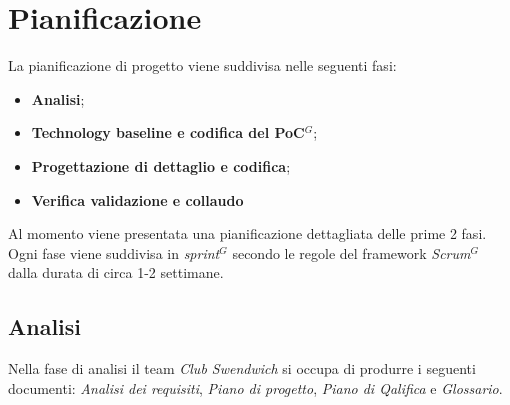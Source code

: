\section{Pianificazione}
La pianificazione di progetto viene suddivisa nelle seguenti fasi:
\begin{itemize}
    \item \textbf{Analisi};
    \item \textbf{Technology baseline e codifica del PoC$^{G}$};
    \item \textbf{Progettazione di dettaglio e codifica};
    \item \textbf{Verifica validazione e collaudo}
\end{itemize} 
Al momento viene presentata una pianificazione dettagliata delle prime 2 fasi. Ogni fase viene suddivisa in \textit{sprint}$^{G}$ secondo le regole
del framework \textit{Scrum}$^{G}$ dalla durata di circa 1-2 settimane. 

\subsection{Analisi}
Nella fase di analisi il team \textit{Club Swendwich} si occupa di produrre i seguenti documenti: \textit{Analisi dei requisiti}, \textit{Piano di progetto}, \textit{Piano di Qalifica} e \textit{Glossario}.

